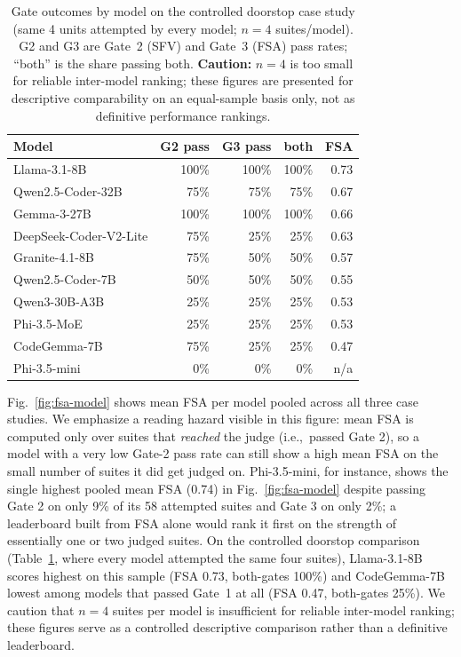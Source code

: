 \documentclass[conference]{IEEEtran}
\newcommand{\ie}{i.e.,\ }
\begin{document}
  \begin{table}[t]
  \centering
  \caption{Gate outcomes by model on the controlled doorstop case study (same
  4 units attempted by every model; $n=4$ suites/model). G2 and G3 are Gate~2
  (SFV) and Gate~3 (FSA) pass rates; ``both'' is the share passing both.
  \textbf{Caution:} $n=4$ is too small for reliable inter-model ranking; these
  figures are presented for descriptive comparability on an equal-sample basis
  only, not as definitive performance rankings.}
  \label{tab:doorstop}
  \small
  \begin{tabular}{@{}lrrrr@{}}
  \toprule
  Model & G2 pass & G3 pass & both & FSA \\
  \midrule
  Llama-3.1-8B & 100\% & 100\% & 100\% & 0.73 \\
  Qwen2.5-Coder-32B & 75\% & 75\% & 75\% & 0.67 \\
  Gemma-3-27B & 100\% & 100\% & 100\% & 0.66 \\
  DeepSeek-Coder-V2-Lite & 75\% & 25\% & 25\% & 0.63 \\
  Granite-4.1-8B & 75\% & 50\% & 50\% & 0.57 \\
  Qwen2.5-Coder-7B & 50\% & 50\% & 50\% & 0.55 \\
  Qwen3-30B-A3B & 25\% & 25\% & 25\% & 0.53 \\
  Phi-3.5-MoE & 25\% & 25\% & 25\% & 0.53 \\
  CodeGemma-7B & 75\% & 25\% & 25\% & 0.47 \\
  Phi-3.5-mini & 0\% & 0\% & 0\% & n/a \\
  \bottomrule
  \end{tabular}
  \end{table}

  Fig.~\ref{fig:fsa-model} shows mean FSA per model pooled across all three
  case studies. We emphasize a reading hazard visible in this figure: mean FSA
  is computed only over suites that \emph{reached} the judge (\ie passed
  Gate 2), so a model with a very low Gate-2 pass rate can still show a high
  mean FSA on the small number of suites it did get judged on. Phi-3.5-mini,
  for instance, shows the single highest pooled mean FSA (0.74) in
  Fig.~\ref{fig:fsa-model} despite passing Gate 2 on only 9\% of its 58
  attempted suites and Gate 3 on only 2\%; a leaderboard built from FSA
  alone would rank it first on the strength of essentially one or two judged
  suites. On the controlled doorstop comparison (Table~\ref{tab:doorstop}, where every
  model attempted the same four suites), Llama-3.1-8B scores highest on this
  sample (FSA 0.73, both-gates 100\%) and CodeGemma-7B lowest among models
  that passed Gate~1 at all (FSA 0.47, both-gates 25\%). We caution that
  $n=4$ suites per model is insufficient for reliable inter-model ranking;
  these figures serve as a controlled descriptive comparison rather than a
  definitive leaderboard.
\end{document}

